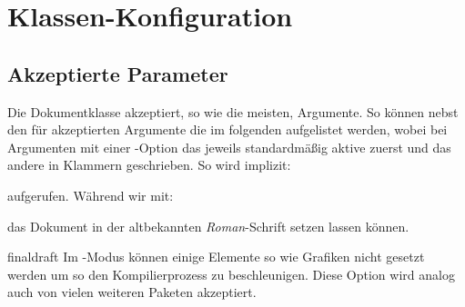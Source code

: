 \documentclass{sopra-base}
\begin{document}
%
%
%
%

\section{Klassen-Konfiguration}
    \subsection{Akzeptierte Parameter}
    Die Dokumentklasse akzeptiert, so wie die meisten, Argumente. So können
    nebst den für  akzeptierten Argumente die im folgenden
    aufgelistet werden, wobei bei Argumenten mit einer -Option
    das jeweils standardmäßig aktive zuerst und das andere in Klammern
    geschrieben. So wird implizit:
    aufgerufen. Während wir mit:
    das Dokument in der altbekannten \emph{Roman}-Schrift setzen lassen können.

    \begin{argument}{final}{draft}
        Im -Modus können einige Elemente so wie Grafiken nicht
        gesetzt werden um so den Kompilierprozess zu beschleunigen.
        Diese Option wird analog auch von vielen weiteren Paketen akzeptiert.
    \end{argument}
\end{document}
